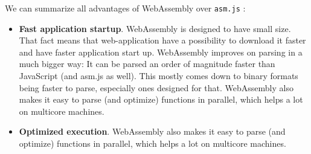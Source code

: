 We can summarize all advantages of WebAssembly over \texttt{asm.js} :
\begin{itemize}  
  \item \textbf{Fast application startup}. WebAssembly is designed to have small size. That fact means that web-application have a possibility to download it faster and have faster application start up.
               WebAssembly improves on parsing in a much bigger way: It can be parsed an order of magnitude faster than JavaScript (and asm.js as well). 
               This mostly comes down to binary formats being faster to parse, especially ones designed for that. 
               WebAssembly also makes it easy to parse (and optimize) functions in parallel, which helps a lot on multicore machines.
  \item \textbf{Optimized execution}. WebAssembly also makes it easy to parse (and optimize) functions in parallel, which helps a lot on multicore machines.
\end{itemize}